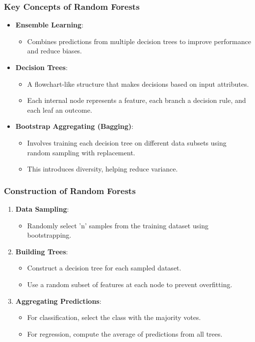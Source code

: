 \documentclass[aspectratio=169]{beamer}
\begin{document}
\begin{frame}[fragile]
    \frametitle{Key Concepts of Random Forests}
    \begin{itemize}
        \item \textbf{Ensemble Learning}:
            \begin{itemize}
                \item Combines predictions from multiple decision trees to improve performance and reduce biases.
            \end{itemize}
        \item \textbf{Decision Trees}:
            \begin{itemize}
                \item A flowchart-like structure that makes decisions based on input attributes.
                \item Each internal node represents a feature, each branch a decision rule, and each leaf an outcome.
            \end{itemize}
        \item \textbf{Bootstrap Aggregating (Bagging)}:
            \begin{itemize}
                \item Involves training each decision tree on different data subsets using random sampling with replacement.
                \item This introduces diversity, helping reduce variance.
            \end{itemize}
    \end{itemize}
\end{frame}

\begin{frame}[fragile]
    \frametitle{Construction of Random Forests}
    \begin{enumerate}
        \item \textbf{Data Sampling}:
            \begin{itemize}
                \item Randomly select 'n' samples from the training dataset using bootstrapping.
            \end{itemize}
        \item \textbf{Building Trees}:
            \begin{itemize}
                \item Construct a decision tree for each sampled dataset.
                \item Use a random subset of features at each node to prevent overfitting.
            \end{itemize}
        \item \textbf{Aggregating Predictions}:
            \begin{itemize}
                \item For classification, select the class with the majority votes.
                \item For regression, compute the average of predictions from all trees.
            \end{itemize}
    \end{enumerate}
\end{frame}
\end{document}

